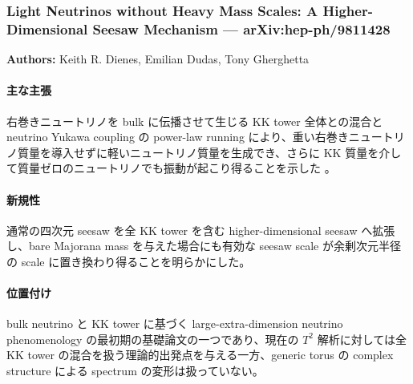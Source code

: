 \subsubsection{Light Neutrinos without Heavy Mass Scales: A Higher-Dimensional Seesaw Mechanism --- arXiv:hep-ph/9811428}

\textbf{Authors:} Keith R. Dienes, Emilian Dudas, Tony Gherghetta

\paragraph{主な主張}
右巻きニュートリノを bulk に伝播させて生じる KK tower 全体との混合と neutrino Yukawa coupling の power-law running により、重い右巻きニュートリノ質量を導入せずに軽いニュートリノ質量を生成でき、さらに KK 質量を介して質量ゼロのニュートリノでも振動が起こり得ることを示した \cite{Dienes:1998sb}。

\paragraph{新規性}
通常の四次元 seesaw を全 KK tower を含む higher-dimensional seesaw へ拡張し、bare Majorana mass を与えた場合にも有効な seesaw scale が余剰次元半径の scale に置き換わり得ることを明らかにした。

\paragraph{位置付け}
bulk neutrino と KK tower に基づく large-extra-dimension neutrino phenomenology の最初期の基礎論文の一つであり、現在の $T^2$ 解析に対しては全 KK tower の混合を扱う理論的出発点を与える一方、generic torus の complex structure による spectrum の変形は扱っていない。
